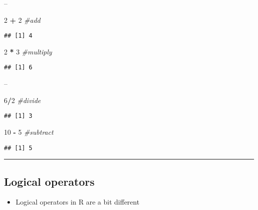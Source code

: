 \documentclass[]{article}
\newenvironment{Shaded}{\begin{snugshade}}{\end{snugshade}}
\newcommand{\CommentTok}[1]{\textcolor[rgb]{0.56,0.35,0.01}{\textit{#1}}}
\newcommand{\DecValTok}[1]{\textcolor[rgb]{0.00,0.00,0.81}{#1}}
\newcommand{\OperatorTok}[1]{\textcolor[rgb]{0.81,0.36,0.00}{\textbf{#1}}}
\newcommand{\StringTok}[1]{\textcolor[rgb]{0.31,0.60,0.02}{#1}}
\providecommand{\tightlist}{%
  \setlength{\itemsep}{0pt}\setlength{\parskip}{0pt}}
\begin{document}
--

\begin{Shaded}
\begin{Highlighting}[]
\DecValTok{2} \OperatorTok{+}\StringTok{ }\DecValTok{2} \CommentTok{#add}
\end{Highlighting}
\end{Shaded}

\begin{verbatim}
## [1] 4
\end{verbatim}

\begin{Shaded}
\begin{Highlighting}[]
\DecValTok{2} \OperatorTok{*}\StringTok{ }\DecValTok{3} \CommentTok{#multiply}
\end{Highlighting}
\end{Shaded}

\begin{verbatim}
## [1] 6
\end{verbatim}

--

\begin{Shaded}
\begin{Highlighting}[]
\DecValTok{6}\OperatorTok{/}\DecValTok{2} \CommentTok{#divide}
\end{Highlighting}
\end{Shaded}

\begin{verbatim}
## [1] 3
\end{verbatim}

\begin{Shaded}
\begin{Highlighting}[]
\DecValTok{10} \OperatorTok{-}\StringTok{ }\DecValTok{5} \CommentTok{#subtract}
\end{Highlighting}
\end{Shaded}

\begin{verbatim}
## [1] 5
\end{verbatim}

\begin{center}\rule{0.5\linewidth}{\linethickness}\end{center}

\hypertarget{logical-operators}{%
\subsection{Logical operators}\label{logical-operators}}

\begin{itemize}
\tightlist
\item
  Logical operators in R are a bit different
\end{itemize}
\end{document}
